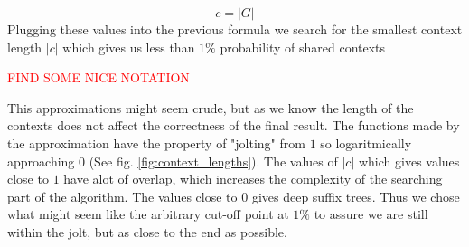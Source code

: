 \documentclass[thesis.tex]{subfiles}
\begin{document}
\begin{equation}
	c=|G|
\end{equation}
Plugging these values into the previous formula we search for the smallest context length $|c|$ which gives us less than $1\%$ probability of shared contexts\\
\par\noindent
\textcolor{red}{FIND SOME NICE NOTATION}\\
\par\noindent
This approximations might seem crude, but as we know the length of the contexts does not affect the correctness of the final result. The functions made by the approximation have the property of "jolting" from $1$ so logaritmically approaching $0$ (See fig. \ref{fig:context_lengths}). The values of $|c|$ which gives values close to $1$ have alot of overlap, which increases the complexity of the searching part of the algorithm. The values close to $0$ gives deep suffix trees. Thus we chose what might seem like the arbitrary cut-off point at $1\%$ to assure we are still within the jolt, but as close to the end as possible.
\end{document}
